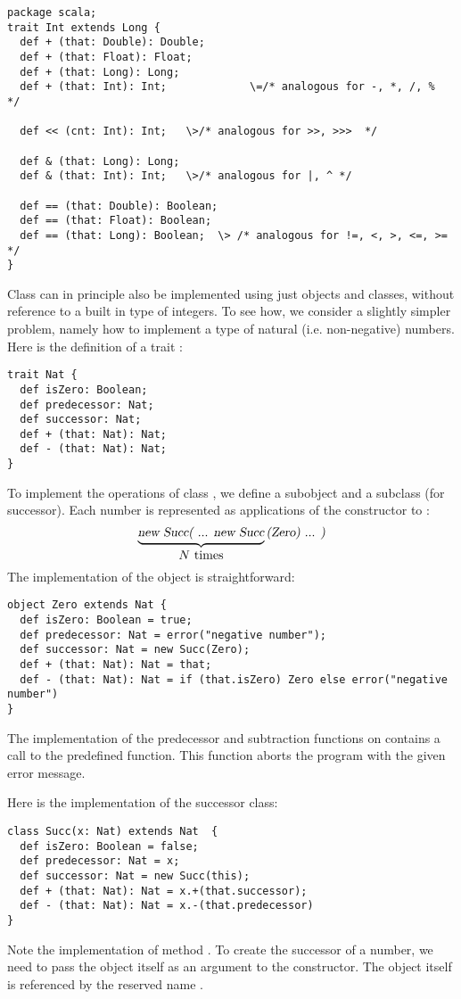 \documentclass[11pt]{book}
\begin{document}
\begin{verbatim}
package scala;
trait Int extends Long { 
  def + (that: Double): Double;
  def + (that: Float): Float;
  def + (that: Long): Long;
  def + (that: Int): Int;             \=/* analogous for -, *, /, %  */

  def << (cnt: Int): Int;   \>/* analogous for >>, >>>  */

  def & (that: Long): Long;
  def & (that: Int): Int;   \>/* analogous for |, ^ */

  def == (that: Double): Boolean;
  def == (that: Float): Boolean;
  def == (that: Long): Boolean;  \> /* analogous for !=, <, >, <=, >=  */
}
\end{verbatim}

Class \verb@Int@ can in principle also be implemented using just
objects and classes, without reference to a built in type of
integers. To see how, we consider a slightly simpler problem, namely
how to implement a type \verb@Nat@ of natural (i.e. non-negative)
numbers. Here is the definition of a trait \verb@Nat@:
\begin{verbatim}
trait Nat {
  def isZero: Boolean;
  def predecessor: Nat;
  def successor: Nat;
  def + (that: Nat): Nat;
  def - (that: Nat): Nat;
}
\end{verbatim}
To implement the operations of class \verb@Nat@, we define a subobject
\verb@Zero@ and a subclass \verb@Succ@ (for successor). Each number
\verb@N@ is represented as \verb@N@ applications of the \verb@Succ@
constructor to \verb@Zero@:
\[
\underbrace{\mbox{\sl new Succ( ... new Succ}}_{\mbox{$N$ times}}\mbox{\sl (Zero) ... )}
\]
The implementation of the \verb@Zero@ object is straightforward:
\begin{verbatim}
object Zero extends Nat {
  def isZero: Boolean = true;
  def predecessor: Nat = error("negative number");
  def successor: Nat = new Succ(Zero);
  def + (that: Nat): Nat = that;
  def - (that: Nat): Nat = if (that.isZero) Zero else error("negative number")
}
\end{verbatim}

The implementation of the predecessor and subtraction functions on
\verb@Zero@ contains a call to the predefined \verb@error@
function. This function aborts the program with the given error
message.

Here is the implementation of the successor class:
\begin{verbatim}
class Succ(x: Nat) extends Nat  {
  def isZero: Boolean = false;
  def predecessor: Nat = x;
  def successor: Nat = new Succ(this);
  def + (that: Nat): Nat = x.+(that.successor);
  def - (that: Nat): Nat = x.-(that.predecessor)
}
\end{verbatim}
Note the implementation of method \verb@successor@. To create the
successor of a number, we need to pass the object itself as an
argument to the \verb@Succ@ constructor.  The object itself is
referenced by the reserved name \verb@this@.   
\end{document}
